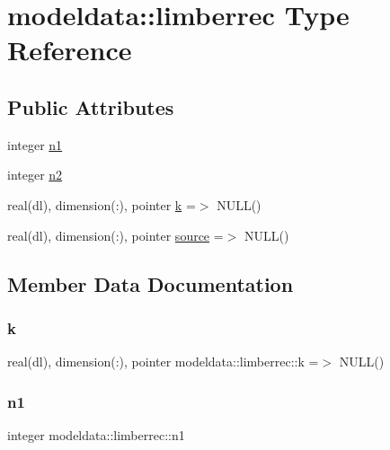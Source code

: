 \hypertarget{structmodeldata_1_1limberrec}{}\section{modeldata\+:\+:limberrec Type Reference}
\label{structmodeldata_1_1limberrec}
\subsection*{Public Attributes}
\begin{DoxyCompactItemize}
\item 
integer \mbox{\hyperlink{structmodeldata_1_1limberrec_aee3832ff460f40dbbdff3115453c56bc}{n1}}
\item 
integer \mbox{\hyperlink{structmodeldata_1_1limberrec_a1f53b69ba50a106b34b7723bced5c827}{n2}}
\item 
real(dl), dimension(\+:), pointer \mbox{\hyperlink{structmodeldata_1_1limberrec_a716d86bc88c6994d80664636a8990e80}{k}} =$>$ N\+U\+LL()
\item 
real(dl), dimension(\+:), pointer \mbox{\hyperlink{structmodeldata_1_1limberrec_a492fc4307ac51f48699f09688787dc72}{source}} =$>$ N\+U\+LL()
\end{DoxyCompactItemize}


\subsection{Member Data Documentation}
\mbox{\label{structmodeldata_1_1limberrec_a716d86bc88c6994d80664636a8990e80}} 
\subsubsection{\texorpdfstring{k}{k}}
{\footnotesize\ttfamily real(dl), dimension(\+:), pointer modeldata\+::limberrec\+::k =$>$ N\+U\+LL()}

\mbox{\label{structmodeldata_1_1limberrec_aee3832ff460f40dbbdff3115453c56bc}} 
\subsubsection{\texorpdfstring{n1}{n1}}
{\footnotesize\ttfamily integer modeldata\+::limberrec\+::n1}

